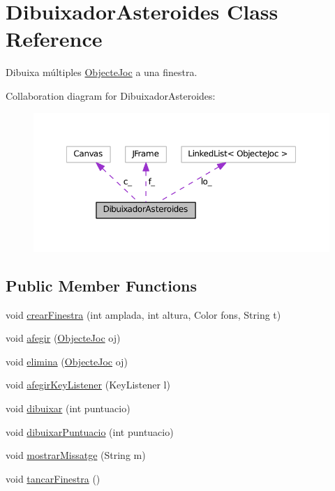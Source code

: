 \hypertarget{class_dibuixador_asteroides}{}\section{Dibuixador\+Asteroides Class Reference}
\label{class_dibuixador_asteroides}


Dibuixa múltiples \hyperlink{interface_objecte_joc}{Objecte\+Joc} a una finestra.  




Collaboration diagram for Dibuixador\+Asteroides\+:\nopagebreak
\begin{figure}[H]
\begin{center}
\leavevmode
\includegraphics[width=350pt]{class_dibuixador_asteroides__coll__graph}
\end{center}
\end{figure}
\subsection*{Public Member Functions}
\begin{DoxyCompactItemize}
\item 
void \hyperlink{class_dibuixador_asteroides_a54a43290703d14aee21e5c87a5e6fc5b}{crear\+Finestra} (int amplada, int altura, Color fons, String t)
\item 
void \hyperlink{class_dibuixador_asteroides_ac70561df846258437f4145a41117e9ef}{afegir} (\hyperlink{interface_objecte_joc}{Objecte\+Joc} oj)
\item 
void \hyperlink{class_dibuixador_asteroides_a22269129b517ba0da55bc16e19e24b57}{elimina} (\hyperlink{interface_objecte_joc}{Objecte\+Joc} oj)
\item 
void \hyperlink{class_dibuixador_asteroides_a9add2702a95cbe7e68100c97a63b297f}{afegir\+Key\+Listener} (Key\+Listener l)
\item 
void \hyperlink{class_dibuixador_asteroides_af2138b89d2a5fe31697b2f206cbc2df4}{dibuixar} (int puntuacio)
\item 
void \hyperlink{class_dibuixador_asteroides_a1b25e3ce2739c6422b80dd209c5b713e}{dibuixar\+Puntuacio} (int puntuacio)
\item 
void \hyperlink{class_dibuixador_asteroides_aeff674b652f4c56d95ecd1dd12a1c4e9}{mostrar\+Missatge} (String m)
\item 
void \hyperlink{class_dibuixador_asteroides_a14186d7acd8ca135252848f916416575}{tancar\+Finestra} ()
\end{DoxyCompactItemize}

